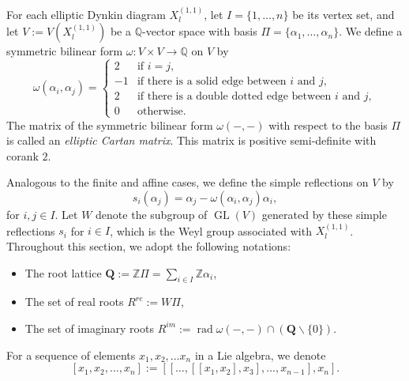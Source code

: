 \documentclass[12pt,reqno]{amsart}
\numberwithin{equation}{section}
\begin{document}
	
	For each elliptic Dynkin diagram $X_{l}^{(1,1)}$, let $I=\{1,\dots, n\}$ be its vertex set, and let
	$V := V(X_{l}^{(1,1)})$
	be a $\mathbb{Q}$-vector space with basis
	$\Pi=\{\alpha_1,\dots,\alpha_{n}\}$. We define a symmetric bilinear form
	$\omega: V\times V\longrightarrow \mathbb{Q}$
	on $V$ by
	\[
	\omega(\alpha_i,\alpha_j)=
	\begin{cases}
		2 & \text{if } i=j,\\
		-1 & \text{if there is a solid edge between } i \text{ and } j,\\
		2 & \text{if there is a double dotted edge between } i \text{ and } j,\\
		0 & \text{otherwise}.
	\end{cases}
	\]
	The matrix of the symmetric bilinear form $\omega(-,-)$ with respect to the basis $\Pi$ is called an {\em elliptic Cartan matrix}. This matrix is positive semi-definite with corank $2$.
	
	Analogous to the finite and affine cases, we define the simple reflections on $V$ by
	\[s_i(\alpha_j)=\alpha_j-\omega(\alpha_i,\alpha_j)\alpha_i,\] for $i,j\in I$.
	Let $W$ denote the subgroup of $\operatorname{GL}(V)$ generated by these simple reflections $s_i$ for $i\in I$, which is the Weyl group associated with $X_l^{(1,1)}$.
	Throughout this section, we adopt the following notations:
	\begin{itemize}
		\item The root lattice $\mathbf{Q}:=\mathbb{Z}\Pi=\sum_{i\in I}\mathbb{Z}\alpha_i$,
		\item The set of real roots $R^{re}:=W\Pi$,
		\item The set of imaginary roots $R^{im}:=\operatorname{rad}\omega(-,-)\cap (\mathbf{Q}\backslash\{0\})$.
	\end{itemize}
	For a sequence of elements $x_1, x_2,\dots x_n$ in a Lie algebra, we denote
	\[
	[x_1, x_2, \dots, x_n] := [[\dots, [[x_1, x_2], x_3], \dots, x_{n-1}],x_n].
	\]
	
\end{document}
